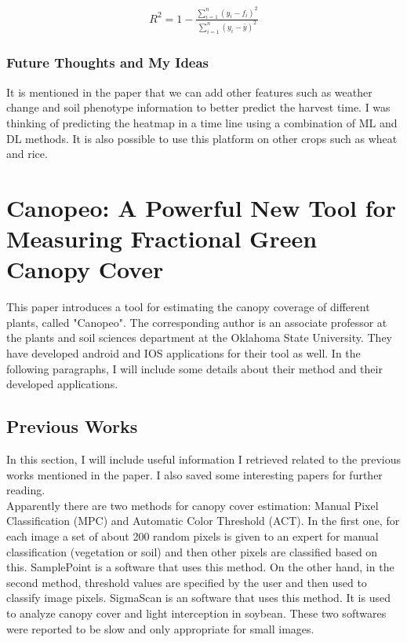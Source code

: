 \documentclass{article}
\begin{document}
\begin{eqnarray*}
R^2 = 1-\frac{\sum_{i=1}^{n}(y_i -f_i)^2}{\sum_{i=1}^{n}(y_i -\bar{y})^2}
\end{eqnarray*}

\subsubsection{Future Thoughts and My Ideas}

It is mentioned in the paper that we can add other features such as weather change and soil phenotype information to better predict the harvest time. I was thinking of predicting the heatmap in a time line using a combination of ML and DL methods. It is also possible to use this platform on other crops such as wheat and rice. 

\section{Canopeo: A Powerful New Tool for Measuring Fractional
Green Canopy Cover ~\cite{patrignan-2015-canopeo}}

This paper introduces a tool for estimating the canopy coverage of different plants, called "Canopeo". The corresponding author is an associate professor at the plants and soil sciences department at the Oklahoma State University. They have developed android and IOS applications for their tool as well. In the following paragraphs, I will include some details about their method and their developed applications.

\subsection{Previous Works}
In this section, I will include useful information I retrieved related to the previous works mentioned in the paper. I also saved some interesting papers for further reading. \\

Apparently there are two methods for canopy cover estimation: Manual Pixel Classification (MPC) and Automatic Color Threshold (ACT). In the first one, for each image a set of about 200 random pixels is given to an expert for manual classification (vegetation or soil) and then other pixels are classified based on this. SamplePoint is a software that uses this method. On the other hand, in the second method, threshold values are specified by the user and then used to classify image pixels. SigmaScan is an software that uses this method. It is used to analyze canopy cover and light interception in soybean. These two softwares were reported to be slow and only appropriate for small images. \\
\end{document}
